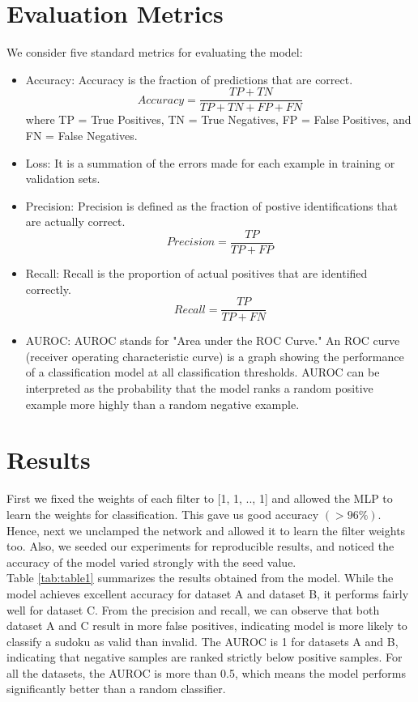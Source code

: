 \documentclass[twoside]{article}
\begin{document}
\section{Evaluation Metrics}
We consider five standard metrics for evaluating the model:
\begin{itemize}
	\item Accuracy: Accuracy is the fraction of predictions that are correct. \\
	\begin{equation}
	Accuracy = \frac{TP + TN}{TP + TN + FP + FN}
	\end{equation}
	where TP = True Positives, TN = True Negatives, FP = False Positives, and FN = False Negatives.
	\item Loss: It is a summation of the errors made for each example in training or validation sets.
	\item Precision: Precision is defined as the fraction of postive identifications that are actually correct.
	\begin{equation}
	Precision = \frac{TP}{TP + FP}
	\end{equation}
	\item Recall: Recall is the proportion of actual positives that are identified correctly.
	\begin{equation}
	Recall = \frac{TP}{TP + FN}
	\end{equation}
	\item AUROC: AUROC stands for "Area under the ROC Curve." An ROC curve (receiver operating characteristic curve) is a graph showing the performance of a classification model at all classification thresholds. AUROC can be interpreted as the probability that the model ranks a random positive example more highly than a random negative example. 
\end{itemize}

\section{Results}
First we fixed the weights of each filter to [1, 1, .., 1] and allowed the MLP to learn the weights for classification. This gave us good accuracy $(>96\%)$. Hence, next we unclamped the network and allowed it to learn the filter weights too. Also, we seeded our experiments for reproducible results, and noticed the accuracy of the model varied strongly with the seed value. \\
Table \ref{tab:table1} summarizes the results obtained from the model. While the model achieves excellent accuracy for dataset A and dataset B, it performs fairly well for dataset C. From the precision and recall, we can observe that both dataset A and C result in more false positives, indicating model is more likely to classify a sudoku as valid than invalid. The AUROC is 1 for datasets A and B, indicating that negative samples are ranked strictly below positive samples. For all the datasets, the AUROC is more than 0.5, which means the model performs significantly better than a random classifier.
\end{document}
